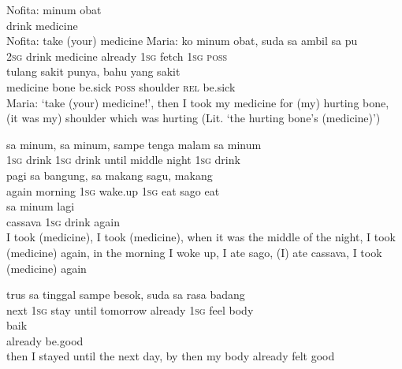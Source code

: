 \ea
\gll   Nofita:   minum   obat\\
 {} drink   medicine\\
\glt
Nofita: take (your) medicine
\z
\ea
\gll   Maria:    {ko}    {minum}    {obat,}    {suda}   sa    {ambil}   sa   pu\\
{} {\textsc{2sg}}    {drink}    {medicine}    {already}   \textsc{1sg}    {fetch}   \textsc{1sg}   \textsc{poss}\\
    {tulang}    {sakit}    {punya,}    {bahu}   yang    {sakit}\\
   {medicine}    {bone}    {be.sick}    {\textsc{poss}}    {shoulder}   \textsc{rel}    {be.sick}\\
\glt
Maria: ‘take (your) medicine!’, then I took my medicine for (my) hurting bone, (it was my) shoulder which was hurting (Lit. ‘the hurting bone’s (medicine)’)
\z

\ea
\gll   sa    {minum,}    {sa}    {minum,}    {sampe}    {tenga}    {malam}    {sa}   minum\\
  \textsc{1sg}    {drink}    {\textsc{1sg}}    {drink}    {until}    {middle}    {night}    {\textsc{1sg}}   drink\\
    {pagi}    {sa}    {bangung,}    {sa}    {makang}    {sagu,}    {makang}\\
   {again}    {morning}    {\textsc{1sg}}    {wake.up}    {\textsc{1sg}}    {eat}    {sago}    {eat}\\
   sa    {minum}    {lagi}\\
   {cassava}   \textsc{1sg}    {drink}    {again}\\
\glt
I took (medicine), I took (medicine), when it was the middle of the night, I took (medicine) again, in the morning I woke up, I ate sago, (I) ate cassava, I took (medicine) again
\z

\ea
\gll   trus    {sa}   tinggal   sampe   besok,   suda   sa   rasa   badang\\
  next    {\textsc{1sg}}   stay   until   tomorrow   already   \textsc{1sg}   feel   body\\
    {baik}\\
   {already}    {be.good}\\
\glt
then I stayed until the next day, by then my body already felt good
\z

